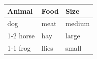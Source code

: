 \documentclass{article}
\begin{document}
\begin{tabular}{lll}
\toprule
Animal & Food & Size \\
\midrule
dog & meat & medium \\
\cmidrule{1-2}
horse & hay & large \\
\cmidrule{1-1}
\cmidrule{3-3}
frog & flies & small \\
\bottomrule
\end{tabular}
\end{document}
